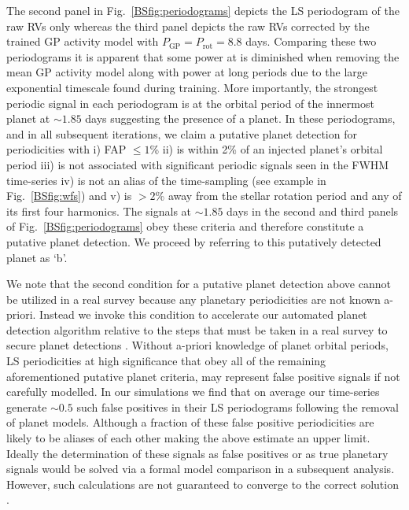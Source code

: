 The second panel in Fig.~\ref{BSfig:periodograms} depicts the LS periodogram of the raw RVs only whereas
the third panel depicts the raw RVs corrected by the trained GP activity model with
$P_{\text{GP}}=P_{\text{rot}}=8.8$ days. Comparing these two periodograms it is apparent
that some power at \prot{} is diminished when removing the mean GP activity model
along with power at long periods due to the large exponential
timescale found during training. More importantly, the strongest periodic signal in each periodogram is
at the orbital period of the innermost planet at $\sim 1.85$ days suggesting the presence of a
planet. In these periodograms, and in all subsequent iterations, we claim a putative planet detection
for periodicities with i) FAP $\leq 1$\% ii) is within 2\% of an injected planet's orbital period iii)
is not associated with significant
periodic signals seen in the FWHM time-series iv) is not an alias of the time-sampling (see example in
Fig.~\ref{BSfig:wfs})
and v) is $>2$\% away from the stellar rotation period and any of its first four harmonics. The signals
at $\sim 1.85$ days in the second and third panels of Fig.~\ref{BSfig:periodograms} obey these criteria and
therefore constitute a putative planet detection. We proceed by referring to this putatively
detected planet as `b'.

We note that the second condition for a putative planet detection above cannot be utilized in a real survey
because any planetary periodicities are not known a-priori. Instead we invoke this condition to
accelerate our automated planet detection algorithm relative to the steps that must be taken in a real survey
to secure planet detections \citep[e.g. Bayesian model comparison;][]{ford07}.
Without a-priori knowledge of planet orbital periods, LS periodicities at high
significance that obey all of the remaining aforementioned putative planet criteria, may represent false positive
signals if not carefully modelled.
In our simulations we find that on average our time-series generate $\sim 0.5$ such false positives in their LS
periodograms following the removal of planet models. Although
a fraction of these false positive periodicities are likely to be aliases of each other making the above
estimate an upper limit. Ideally the determination of these signals as false positives or as true planetary
signals would be solved via a formal model comparison in a subsequent analysis. However, such calculations are
not guaranteed to converge to the correct solution \citep[see][]{dumusque17}.


